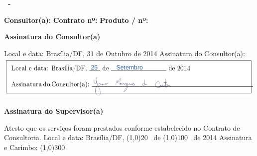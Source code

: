 \addtolength{\topmargin}{2.5cm}
\thispagestyle{empty}

{\bf \ProjectCode \ -} \ProductDescription

\vspace{2cm}

\begin{minipage}{\textwidth}
  {\bf Consultor(a): \MyName}
  \newline
  {\bf Contrato nº: \ContractNumber}
  \newline
  {\bf Produto / nº: \ProductNumber}
\end{minipage}

\vspace{1.5cm}

{\bf Assinatura do Consultor(a)}


\begin{framed}
\noindent Local e data: Brasília/DF, {\color[rgb]{0.2,0.2,0.5} 31} de {\color[rgb]{0.2,0.2,0.5}Outubro} de 2014
\newline
\newline
Assinatura do Consultor(a): \includegraphics[scale=0.15]{assinatura.png}
\end{framed}

\vspace{1cm}

{\bf Assinatura do Supervisor(a)}

\begin{framed}
\noindent Atesto que os serviços foram prestados conforme estabelecido no
Contrato de Consultoria.
\newline
\newline
Local e data: Brasília/DF, \line(1,0){20} \ de \line(1,0){100} \ de 2014
\newline
\newline
Assinatura e Carimbo: \line(1,0){300}
\end{framed}

\vspace{1cm}

